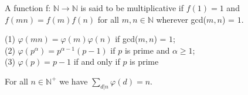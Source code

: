 \documentclass[a4paper]{article}
\begin{document}
\begin{definition}
A function f: $\mathbb{N} \rightarrow \mathbb{N}$ is said to be multiplicative if $f(1) = 1$ and $f(mn) = f(m)f(n)$ for all $m, n \in \mathbb{N}$ wherever gcd($m, n$) = $1$.
\end{definition}


\begin{theorem}
(1) $\varphi (mn) = \varphi (m) \varphi (n)$ if gcd($m, n$) = $1$; \\
(2) $\varphi (p^{\alpha}) = p^{\alpha - 1}(p - 1)$ if $p$ is prime and $\alpha \geq 1$; \\
(3) $\varphi(p) = p - 1$ if and only if $p$ is prime
\end{theorem}


\begin{theorem}
For all $n \in \mathbb{N}^{+}$ we have $\sum_{d|n} \varphi (d) = n$.
\end{theorem}
\end{document}
